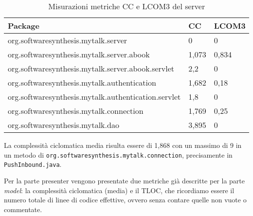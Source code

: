 \begin{table}[H]
\centering
{}
\begin{tabular}{p{}ll}
\toprule Package & CC  & LCOM3\\
\midrule
org.softwaresynthesis.mytalk.server & 0 & 0\\
org.softwaresynthesis.mytalk.server.abook & 1,073 & 0,834\\
org.softwaresynthesis.mytalk.server.abook.servlet & 2,2 & 0\\
org.softwaresynthesis.mytalk.authentication & 1,682 & 0,18\\
org.softwaresynthesis.mytalk.authentication.servlet & 1,8 & 0\\
org.softwaresynthesis.mytalk.connection & 1,769 & 0,25\\
org.softwaresynthesis.mytalk.dao & 3,895 & 0\\
\bottomrule
\end{tabular}
\caption{Misurazioni metriche CC e LCOM3 del server} \label{tab: metricheCCLCOM3server}
\end{table}

La complessità ciclomatica media risulta essere di 1,868 con un massimo di 9 in un metodo di \texttt{org.softwaresynthesis.mytalk.connection}, precisamente in \texttt{PushInbound.java}.

Per la parte presenter vengono presentate due metriche già descritte per la parte \textit{model}: la complessità ciclomatica (media) e il TLOC, che ricordiamo essere il numero totale di linee di codice effettive, ovvero senza contare quelle non vuote o commentate.

